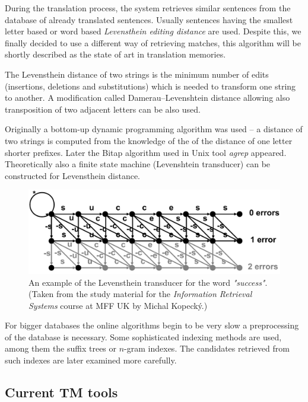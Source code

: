 During the translation process, the system retrieves similar sentences from the database of already translated sentences. Usually sentences having the smallest letter based or word based \emph{Levensthein editing distance} are used. Despite this, we finally decided to use a different way of retrieving matches, this algorithm will be shortly described as the state of art in translation memories.

The Levensthein distance of two strings is the minimum number of edits (insertions, deletions and substitutions) which is needed to transform one string to another. A modification called Damerau–Levenshtein distance allowing also transposition of two adjacent letters can be also used.

Originally a bottom-up dynamic programming algorithm was used -- a distance of two strings is computed from the knowledge of the of the distance of one letter shorter prefixes. Later the Bitap algorithm used in Unix tool \emph{agrep} appeared. Theoretically also a finite state machine (Levenshtein transducer) can be constructed for Levensthein distance.

\begin{figure}
\begin{center}
\includegraphics[scale=0.65]{./figures/levensthein.pdf}
\end{center}

\caption{An example of the Levensthein transducer for the word \emph{"success"}. (Taken from the study material for the \emph{Information Retrieval Systems} course at MFF UK by Michal Kopecký.)}
\end{figure}

For bigger databases the online algorithms begin to be very slow a preprocessing of the database is necessary. Some sophisticated indexing methods are used, among them the suffix trees or $n$-gram indexes. The candidates retrieved from such indexes are later examined more carefully.

\subsection{Current TM tools}

